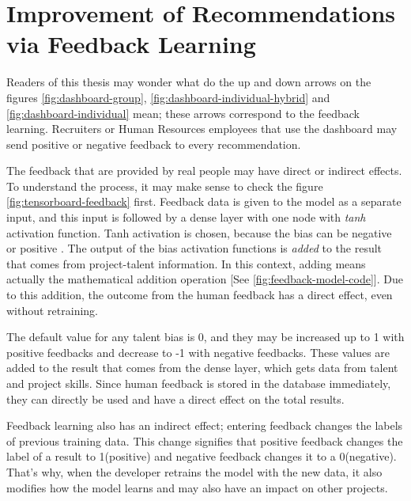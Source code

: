\section{Improvement of Recommendations via Feedback Learning}\label{section:feedback-learning}

Readers of this thesis may wonder what do the up and down arrows on the figures \ref{fig:dashboard-group}, \ref{fig:dashboard-individual-hybrid} and \ref{fig:dashboard-individual} mean; these arrows correspond to the feedback learning. Recruiters or Human Resources employees that use the dashboard may send positive or negative feedback to every recommendation. 

The feedback that are provided by real people may have direct or indirect effects. To understand the process, it may make sense to check the figure \ref{fig:tensorboard-feedback} first. Feedback data is given to the model as a separate input, and this input is followed by a dense layer with one node with \textit{tanh} activation function. Tanh activation is chosen, because the bias can be negative or positive \cite{pedamonti2018comparison}. The output of the bias activation functions is \textit{added} to the result that comes from project-talent information. In this context, adding means actually the mathematical addition operation [See \ref{fig:feedback-model-code}]. Due to this addition, the outcome from the human feedback has a direct effect, even without retraining. 

The default value for any talent bias is 0, and they may be increased up to 1 with positive feedbacks and decrease to -1 with negative feedbacks. These values are added to the result that comes from the dense layer, which gets data from talent and project skills. Since human feedback is stored in the database immediately, they can directly be used and have a direct effect on the total results.


Feedback learning also has an indirect effect;  entering feedback changes the labels of previous training data. This change signifies that positive feedback changes the label of a result to 1(positive) and negative feedback changes it to a 0(negative). That's why, when the developer retrains the model with the new data, it also modifies how the model learns and may also have an impact on other projects.


